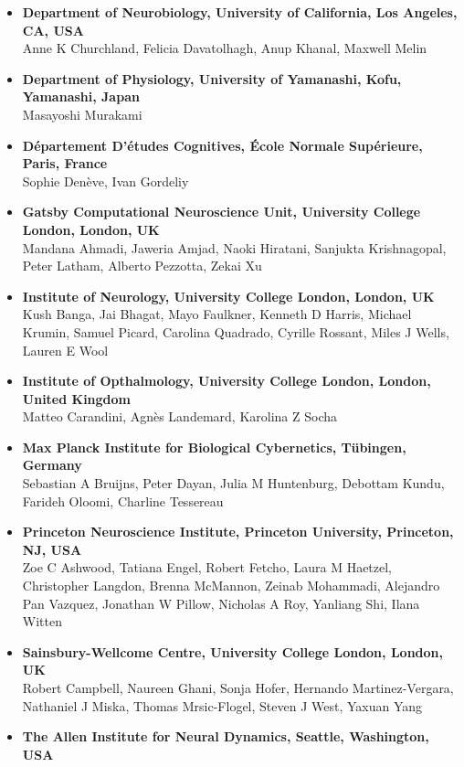 \documentclass[10pt,lineno]{elife}
\begin{document}
\begin{itemize}
  Ila Fiete, Ari Liu, Rylan Schaeffer
  \item \textbf{Department of Neurobiology, University of California, Los Angeles, CA, USA}\\
  Anne K Churchland, Felicia Davatolhagh, Anup Khanal, Maxwell Melin
  \item \textbf{Department of Physiology, University of Yamanashi, Kofu, Yamanashi, Japan}\\
  Masayoshi Murakami
  \item \textbf{Département D’études Cognitives, École Normale Supérieure, Paris, France}\\
  Sophie Denève, Ivan Gordeliy
  \item \textbf{Gatsby Computational Neuroscience Unit, University College London, London, UK}\\
  Mandana Ahmadi, Jaweria Amjad, Naoki Hiratani, Sanjukta Krishnagopal, Peter Latham, Alberto Pezzotta, Zekai Xu
  \item \textbf{Institute of Neurology, University College London, London, UK}\\
  Kush Banga, Jai Bhagat, Mayo Faulkner, Kenneth D Harris, Michael Krumin, Samuel Picard, Carolina Quadrado, Cyrille Rossant, Miles J Wells, Lauren E Wool
  \item \textbf{Institute of Opthalmology, University College London, London, United Kingdom}\\
  Matteo Carandini, Agnès Landemard, Karolina Z Socha
  \item \textbf{Max Planck Institute for Biological Cybernetics, Tübingen, Germany}\\
  Sebastian A Bruijns, Peter Dayan, Julia M Huntenburg, Debottam Kundu, Farideh Oloomi, Charline Tessereau
  \item \textbf{Princeton Neuroscience Institute, Princeton University, Princeton, NJ, USA}\\
  Zoe C Ashwood, Tatiana Engel, Robert Fetcho, Laura M Haetzel, Christopher Langdon, Brenna McMannon, Zeinab Mohammadi, Alejandro Pan Vazquez, Jonathan W Pillow, Nicholas A Roy, Yanliang Shi, Ilana Witten
  \item \textbf{Sainsbury-Wellcome Centre, University College London, London, UK}\\
  Robert Campbell, Naureen Ghani, Sonja Hofer, Hernando Martinez-Vergara, Nathaniel J Miska, Thomas Mrsic-Flogel, Steven J West, Yaxuan Yang
  \item \textbf{The Allen Institute for Neural Dynamics, Seattle, Washington, USA}\\

\end{itemize}
\end{document}
